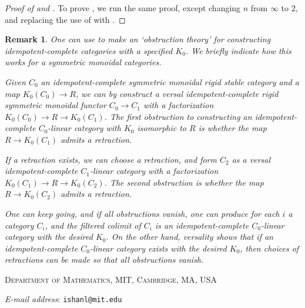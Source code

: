 \documentclass[12pt,oneside]{article}
\makeatletter
\newcounter{counter}
\newtheorem{rmk}[counter]{Remark}
\newcommand{\Addresses}{{%
		\bigskip
		\footnotesize
		\textsc{Department of Mathematics, MIT, Cambridge, MA, USA}\par\nopagebreak
		\textit{E-mail address}: \texttt{ishanl@mit.edu}
}}
\makeatother
\begin{document}
\begin{proof}[Proof of  and ]
	To prove , we run the same proof, except changing $n$ from $\infty$ to $2$, and replacing the use of  with .
\end{proof}

\begin{rmk}
	One can use  to make an `obstruction theory' for constructing \textit{idempotent-complete} categories with a specified $K_0$. We briefly indicate how this works for a symmetric monoidal categories.
	
	Given $C_0$ an idempotent-complete symmetric monoidal rigid stable category and a map $K_0(C_0) \to R$, we can by  construct a versal idempotent-complete rigid symmetric monoidal functor $C_0 \to C_1$ with a factorization $K_0(C_0) \to R \to K_0(C_1)$. The first obstruction to constructing an idempotent-complete $C_0$-linear category with $K_0$ isomorphic to $R$ is whether the map $R \to K_0(C_1)$ admits a retraction.
	
	If a retraction exists, we can choose a retraction, and form $C_2$ as a versal idempotent-complete $C_1$-linear category with a factorization $K_0(C_1) \to R \to K_0(C_2)$. The second obstruction is whether the map $R \to K_0(C_2)$ admits a retraction. 
	
	One can keep going, and if all obstructions vanish, one can produce for each $i$ a category $C_i$, and the filtered colimit of $C_i$ is an idempotent-complete $C_0$-linear category with the desired $K_0$. On the other hand, versality shows that if an idempotent-complete $C_0$-linear category exists with the desired $K_0$, then choices of retractions can be made so that all obstructions vanish.
\end{rmk}

	\printbibliography
	\Addresses
\end{document}
